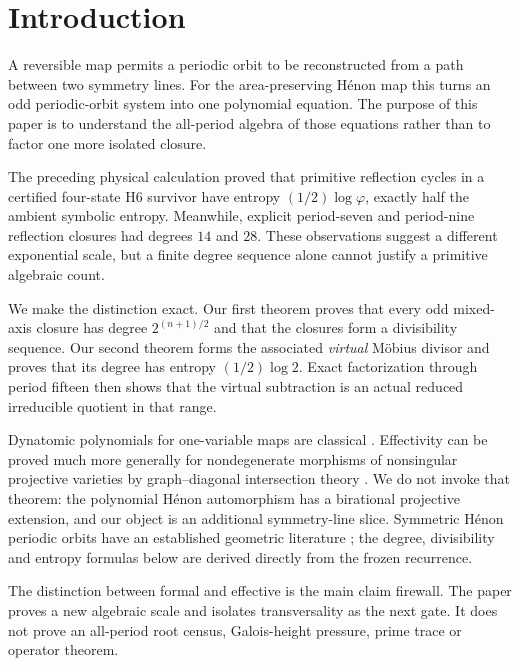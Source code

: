 \section{Introduction}

A reversible map permits a periodic orbit to be reconstructed from a path
between two symmetry lines.  For the area-preserving H\'enon map this turns an
odd periodic-orbit system into one polynomial equation.  The purpose of this
paper is to understand the all-period algebra of those equations rather than
to factor one more isolated closure.

The preceding physical calculation proved that primitive reflection cycles
in a certified four-state H6 survivor have entropy
$(1/2)\log\varphi$, exactly half the ambient symbolic entropy.  Meanwhile,
explicit period-seven and period-nine reflection closures had degrees $14$
and $28$.  These observations suggest a different exponential scale, but a
finite degree sequence alone cannot justify a primitive algebraic count.

We make the distinction exact.  Our first theorem proves that every odd
mixed-axis closure has degree $2^{(n+1)/2}$ and that the closures form a
divisibility sequence.  Our second theorem forms the associated \emph{virtual}
M\"obius divisor and proves that its degree has entropy $(1/2)\log2$.  Exact
factorization through period fifteen then shows that the virtual subtraction
is an actual reduced irreducible quotient in that range.

Dynatomic polynomials for one-variable maps are classical
\citep{MortonSilverman1994}.  Effectivity can be proved much more generally
for nondegenerate morphisms of nonsingular projective varieties by
graph--diagonal intersection theory \citep{Hutz2010}.  We do not invoke that
theorem: the polynomial H\'enon automorphism has a birational projective
extension, and our object is an additional symmetry-line slice.  Symmetric
H\'enon periodic orbits have an established geometric literature
\citep{YamaguchiTanikawa2005}; the degree, divisibility and entropy formulas
below are derived directly from the frozen recurrence.

The distinction between formal and effective is the main claim firewall.
The paper proves a new algebraic scale and isolates transversality as the next
gate.  It does not prove an all-period root census, Galois-height pressure,
prime trace or operator theorem.
